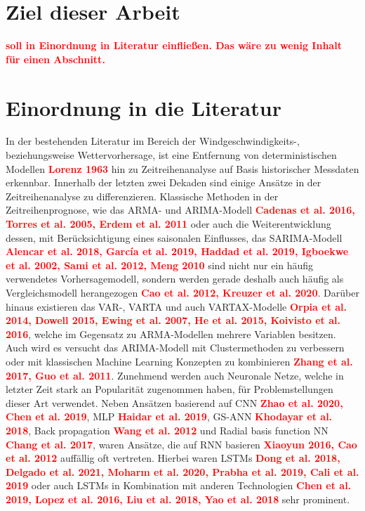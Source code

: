 \documentclass[
12pt, %
toc=listofnumbered, %
toc=chapterentrydotfill, %
numbers=noenddot, %
captions=tableheading, %
]{scrreprt}
\let\Oldsection\section
\renewcommand{\section}{\FloatBarrier\Oldsection}
\newcommand{\highlight}[1]{\textbf{\textcolor{red}{#1}}}
\begin{document}
\section{Ziel dieser Arbeit}
\highlight{soll in Einordnung in Literatur einfließen. Das wäre zu wenig Inhalt für einen Abschnitt.}

\section{Einordnung in die Literatur}

In der bestehenden Literatur im Bereich der Windgeschwindigkeits-, beziehungsweise Wettervorhersage, ist eine Entfernung von 
deterministischen Modellen \highlight{Lorenz 1963} hin zu Zeitreihenanalyse auf Basis historischer Messdaten erkennbar. 
Innerhalb der letzten zwei Dekaden sind einige Ansätze in der Zeitreihenanalyse zu differenzieren. Klassische Methoden in der 
Zeitreihenprognose, wie das ARMA- und ARIMA-Modell \highlight{Cadenas et al. 2016, Torres et al. 2005, Erdem et al. 2011} oder auch 
die Weiterentwicklung dessen, mit Berücksichtigung eines saisonalen Einflusses, das SARIMA-Modell 
\highlight{Alencar et al. 2018, García et al. 2019, Haddad et al. 2019, Igboekwe et al. 2002, Sami et al. 2012, Meng 2010} sind 
nicht nur ein häufig verwendetes Vorhersagemodell, sondern werden gerade deshalb auch häufig als Vergleichsmodell herangezogen 
\highlight{Cao et al. 2012, Kreuzer et al. 2020}. Darüber hinaus existieren das VAR-, VARTA und auch VARTAX-Modelle 
\highlight{Orpia et al. 2014, Dowell 2015, Ewing et al. 2007, He et al. 2015, Koivisto et al. 2016}, 
welche im Gegensatz zu ARMA-Modellen mehrere Variablen besitzen. Auch wird es versucht das ARIMA-Modell mit Clustermethoden 
zu verbessern oder mit klassischen Machine Learning Konzepten zu kombinieren \highlight{Zhang et al. 2017, Guo et al. 2011}. 
Zunehmend werden auch Neuronale Netze, welche in letzter Zeit stark an Popularität zugenommen haben, für Problemstellungen dieser 
Art verwendet. Neben Ansätzen basierend auf CNN \highlight{Zhao et al. 2020, Chen et al. 2019}, MLP \highlight{Haidar et al. 2019}, 
GS-ANN \highlight{Khodayar et al. 2018}, Back propagation \highlight{Wang et al. 2012} und Radial basis function NN \highlight{Chang et al. 2017}, 
waren Ansätze, die auf RNN basieren \highlight{Xiaoyun 2016, Cao et al. 2012} auffällig oft vertreten. Hierbei waren LSTMs  
\highlight{Dong et al. 2018, Delgado et al. 2021, Moharm et al. 2020, Prabha et al. 2019, Cali et al. 2019} oder auch LSTMs in Kombination mit 
anderen Technologien \highlight{Chen et al. 2019, Lopez et al. 2016, Liu et al. 2018, Yao et al. 2018} sehr prominent. 
\end{document}
